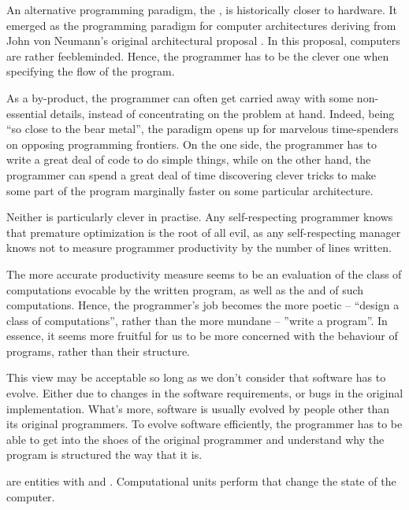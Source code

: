 An alternative programming paradigm, the , is historically
closer to hardware. It emerged as the programming paradigm for computer
architectures deriving from John von Neumann's original architectural proposal
\cite{von-neumann}. In this proposal, computers are rather feebleminded.
Hence, the programmer has to be the clever one when specifying the flow of the
program.


As a by-product, the programmer can often get carried away with some
non-essential details, instead of concentrating on the problem at hand. Indeed,
being ``so close to the bear metal'', the paradigm opens up for marvelous
time-spenders on opposing programming frontiers. On the one side, the
programmer has to write a great deal of code to do simple things, while on the
other hand, the programmer can spend a great deal of time discovering clever
tricks to make some part of the program marginally faster on some particular
architecture.

Neither is particularly clever in practise. Any self-respecting programmer
knows that premature optimization is the root of all evil\cite{knuth-goto}, as
any self-respecting manager knows not to measure programmer productivity by the
number of lines written.


The more accurate productivity measure seems to be an evaluation of the class
of computations evocable by the written program, as well as the  and
  of such computations. Hence, the programmer's
job becomes the more poetic -- ``design a class of computations'', rather than
the more mundane -- ''write a program''. In essence, it seems more fruitful for
us to be more concerned with the behaviour of programs, rather than their
structure.

This view may be acceptable so long as we don't consider that software has to
evolve. Either due to changes in the software requirements, or bugs in the
original implementation. What's more, software is usually evolved by people
other than its original programmers. To evolve software efficiently, the
programmer has to be able to get into the shoes of the original programmer and
understand why the program is structured the way that it is.

\begin{definition}

 are entities with  and .
Computational units perform  that change the state of the
computer.

\end{definition}

